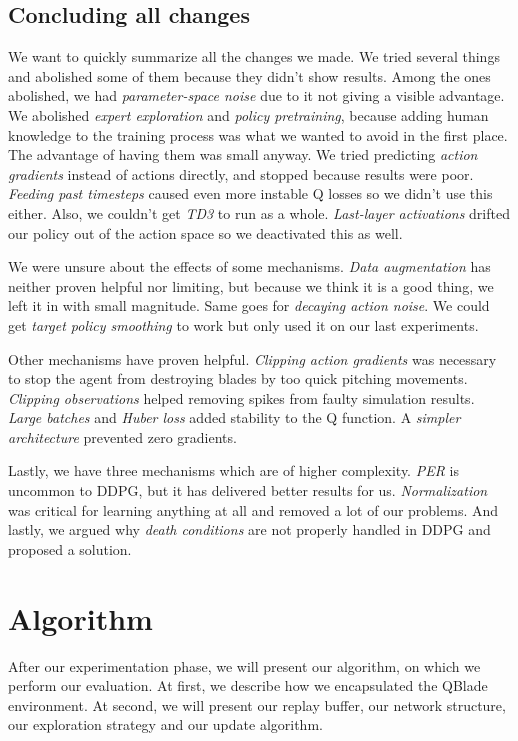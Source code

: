 \documentclass[hyperref,final,beleg]{cgvpub}
\begin{document}
\section{Concluding all changes}

We want to quickly summarize all the changes we made. We tried several things and abolished some of them because they didn't show results. Among the ones abolished, we had \textit{parameter-space noise} due to it not giving a visible advantage. We abolished \textit{expert exploration} and \textit{policy pretraining}, because adding human knowledge to the training process was what we wanted to avoid in the first place. The advantage of having them was small anyway. We tried predicting \textit{action gradients} instead of actions directly, and stopped because results were poor. \textit{Feeding past timesteps} caused even more instable Q losses so we didn't use this either. Also, we couldn't get \textit{TD3} to run as a whole. \textit{Last-layer activations} drifted our policy out of the action space so we deactivated this as well.

We were unsure about the effects of some mechanisms. \textit{Data augmentation} has neither proven helpful nor limiting, but because we think it is a good thing, we left it in with small magnitude. Same goes for \textit{decaying action noise}. We could get \textit{target policy smoothing} to work but only used it on our last experiments.

Other mechanisms have proven helpful. \textit{Clipping action gradients} was necessary to stop the agent from destroying blades by too quick pitching movements. \textit{Clipping observations} helped removing spikes from faulty simulation results. \textit{Large batches} and \textit{Huber loss} added stability to the Q function. A \textit{simpler architecture} prevented zero gradients.

Lastly, we have three mechanisms which are of higher complexity. \textit{\ac{PER}} is uncommon to \ac{DDPG}, but it has delivered better results for us. \textit{Normalization} was critical for learning anything at all and removed a lot of our problems. And lastly, we argued why \textit{death conditions} are not properly handled in \ac{DDPG} and proposed a solution.

\chapter{Algorithm}

After our experimentation phase, we will present our algorithm, on which we perform our evaluation. At first, we describe how we encapsulated the QBlade environment. At second, we will present our replay buffer, our network structure, our exploration strategy and our update algorithm.
\end{document}
